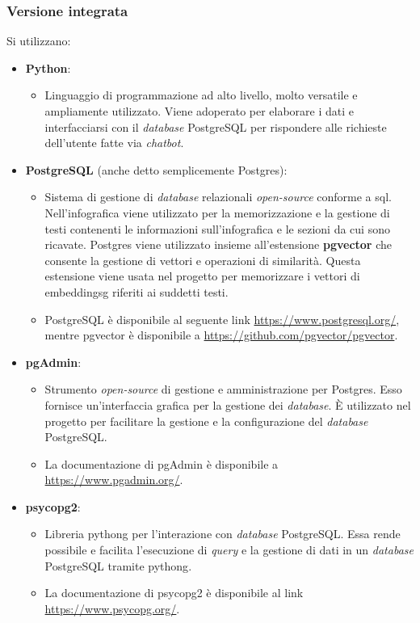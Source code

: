 \subsubsection{Versione integrata}
Si utilizzano:
\begin{itemize}
    \item \textbf{Python}:
    \begin{itemize}
        \item Linguaggio di programmazione ad alto livello, molto versatile e ampliamente utilizzato. Viene adoperato per elaborare i dati e interfacciarsi con il \emph{database} PostgreSQL per rispondere alle richieste dell'utente fatte via \emph{chatbot}.
    \end{itemize}

    \item \textbf{PostgreSQL} (anche detto semplicemente Postgres):
    \begin{itemize}
        \item Sistema di gestione di \emph{database} relazionali \emph{open-source} conforme a \gls{sql}. Nell'infografica viene utilizzato per la memorizzazione e la gestione di testi contenenti le informazioni sull'infografica e le sezioni da cui sono ricavate.
        Postgres viene utilizzato insieme all'estensione \textbf{pgvector} che consente la gestione di vettori e operazioni di similarità. Questa estensione viene usata nel progetto per memorizzare i vettori di \gls{embeddingsg} riferiti ai suddetti testi. 
        \item PostgreSQL è disponibile al seguente link \href{https://www.postgresql.org/}{https://www.postgresql.org/}, mentre pgvector è disponibile a \href{https://github.com/pgvector/pgvector}{https://github.com/pgvector/pgvector}.
    \end{itemize}
    
    \item \textbf{pgAdmin}:
    \begin{itemize}
        \item Strumento \emph{open-source} di gestione e amministrazione per Postgres. Esso fornisce un'interfaccia grafica per la gestione dei \emph{database}. È utilizzato nel progetto per facilitare la gestione e la configurazione del \emph{database} PostgreSQL.
        \item La documentazione di pgAdmin è disponibile a \href{https://www.pgadmin.org/}{https://www.pgadmin.org/}.
    \end{itemize}
    
    \item \textbf{psycopg2}:
    \begin{itemize}
        \item Libreria \gls{pythong} per l'interazione con \emph{database} PostgreSQL. Essa rende possibile e facilita l'esecuzione di \emph{query} e la gestione di dati in un \emph{database} PostgreSQL tramite \gls{pythong}.
        \item La documentazione di psycopg2 è disponibile al link \href{https://www.psycopg.org/}{https://www.psycopg.org/}.
    \end{itemize}
    

\end{itemize}
